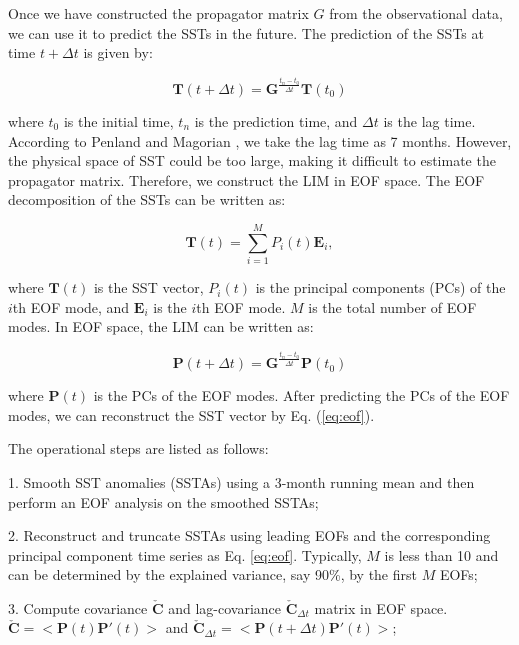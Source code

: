 \documentclass[12pt,a4paper]{article}
\begin{document}
Once we have constructed the propagator matrix $G$ from the observational data, we can use it to predict the SSTs in the future. The prediction of the SSTs at time $t+\Delta t$ is given by:

\begin{equation}
\label{eq:lim-6}
\mathbf{T}(t+\Delta t) = \mathbf{G} ^{\frac{t_n - t_0}{\Delta t}} \mathbf{T}(t_0)
\end{equation}

where $t_0$ is the initial time, $t_n$ is the prediction time, and $\Delta t$ is the lag time. According to Penland and Magorian \cite{Penland1993}, we take the lag time as 7 months. However, the physical space of SST could be too large, making it difficult to estimate the propagator matrix. Therefore, we construct the LIM in EOF space. The EOF decomposition of the SSTs can be written as:

\begin{equation}
\label{eq:eof}
\mathbf{T}(t) = \sum_{i=1}^M P_i(t) \mathbf{E}_i,
\end{equation}
    
where $\mathbf{T}(t)$ is the SST vector, $P_i(t)$ is the principal components (PCs) of the $i$th EOF mode, and $\mathbf{E}_i$ is the $i$th EOF mode. $M$ is the total number of EOF modes. In EOF space, the LIM can be written as:

\begin{equation}
\label{eq:eof-lim}
\mathbf{P}(t+\Delta t) = \mathbf{G} ^{\frac{t_n - t_0}{\Delta t}} \mathbf{P}(t_0)
\end{equation}

where $\mathbf{P}(t)$ is the PCs of the EOF modes. After predicting the PCs of the EOF modes, we can reconstruct the SST vector by Eq. (\ref{eq:eof}).

The operational steps are listed as follows:

1. Smooth SST anomalies (SSTAs) using a 3-month running mean and then perform an EOF analysis on the smoothed SSTAs;

2. Reconstruct and truncate SSTAs using leading EOFs and the corresponding principal component time series as Eq. \ref{eq:eof}. Typically, $M$ is less than 10 and can be determined by the explained variance, say 90\%, by the first $M$ EOFs;

3. Compute covariance $\mathbf{\check{C}}$ and lag-covariance $\mathbf{\check{C}}_{\Delta t}$ matrix in EOF space. $\mathbf{\check{C}} = <\mathbf{P}(t) \mathbf{P}'(t)>$ and $\mathbf{\check{C}}_{\Delta t} = <\mathbf{P}(t+\Delta t) \mathbf{P}'(t)>$;
\end{document}

